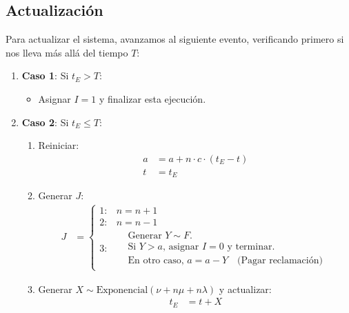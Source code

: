 \documentclass[12pt, a4paper]{article}
\begin{document}
\subsection*{Actualización}
Para actualizar el sistema, avanzamos al siguiente evento, verificando primero si nos lleva más allá del tiempo $T$:

\begin{enumerate}
    \item \textbf{Caso 1}: Si $t_E > T$:
    \begin{itemize}
        \item Asignar $I = 1$ y finalizar esta ejecución.
    \end{itemize}
    
    \item \textbf{Caso 2}: Si $t_E \leq T$:
    \begin{enumerate}
        \item Reiniciar:
        \begin{align*}
            a &= a + n \cdot c \cdot (t_E - t)  \\
            t &= t_E \quad 
        \end{align*}
        
        \item Generar $J$:
        \begin{align*}
            J &= 
            \begin{cases}
                1: & n = n + 1 \\
                2: & n = n - 1  \\
                3: & 
                \begin{aligned}
                    &\text{Generar } Y \sim F. \\
                    &\text{Si } Y > a \text{, asignar } I = 0 \text{ y terminar.} \\
                    &\text{En otro caso, } a = a - Y \quad \text{(Pagar reclamación)}
                \end{aligned}
            \end{cases}
        \end{align*}
        
        \item Generar $X \sim \text{Exponencial}(\nu + n\mu + n\lambda)$ y actualizar:
        \begin{align*}
            t_E &= t + X
        \end{align*}
    \end{enumerate}
\end{enumerate}
\end{document}
